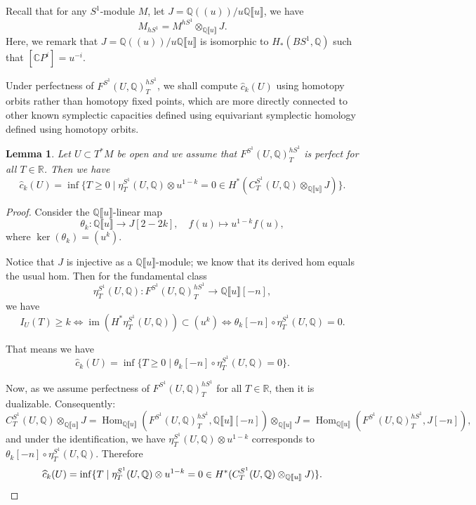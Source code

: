 \documentclass[11pt]{amsart}
\numberwithin{equation}{section}
\theoremstyle{plain}
\newtheorem{Lemma}[lemma]{Lemma}
\theoremstyle{definition}
\theoremstyle{remark}
\newcommand{\bC} { {\mathbb{C}}}
\newcommand{\bQ} { {\mathbb{Q}}}
\newcommand{\bR} { {\mathbb{R}}}
\newcommand{\fpw}[1]{{\llbracket #1\rrbracket}}
\newcommand{\fls}[1]{{(\!(#1 )\!) }}
\newcommand\im{ {\operatorname{im}} }
\newcommand\Hom{\operatorname{Hom}}
\begin{document}
Recall that for any $S^1$-module $M$, let $J=\bQ\fls{u}/u\bQ\fpw{u}$, we have
\[M_{hS^1}= M^{hS^1} \otimes_{\bQ\fpw{u}} J.\]
Here, we remark that $J=\bQ\fls{u}/u\bQ\fpw{u}$ is isomorphic to $H_{*}(BS^1,\bQ)$ such that $[\bC P^i]=u^{-i}$.




Under perfectness of $F^{S^1}(U,\bQ)^{hS^1}_T$, we shall compute $\widehat{c}_k(U)$ using homotopy orbits rather than homotopy fixed points, which are more directly connected to other known symplectic capacities defined using equivariant symplectic homology defined using homotopy orbits.


\begin{Lemma}\label{lemma: hat c definition non-deg case}Let $U\subset T^*M$ be open and we assume that $F^{S^1}(U,\bQ)^{hS^1}_T$ is perfect for all $T\in \bR$.
Then we have 
\[\widehat{c}_k(U)=\inf\{T\geq 0\mid \eta_T^{S^1}(U,\bQ)\otimes u^{1-k}=0\in H^*(C_T^{S^1} (U,\bQ)\otimes_{\bQ\fpw{u}} J)\}.\]
\end{Lemma}
\begin{proof}Consider the $\bQ\fpw{u}$-linear map 
\[\theta_k:\bQ\fpw{u}\to J[2-2k],\quad f(u)\mapsto u^{1-k}f(u),\]
where $\ker(\theta_k)=(u^k)$.

Notice that $J$ is injective as a $\bQ\fpw{u}$-module; we know that its derived hom equals the usual hom. Then for the fundamental class 
\[\eta_T^{S^1}(U,\bQ): F^{S^1}(U,\bQ)^{hS^1}_T\to  \bQ\fpw{u}[-n],\]
we have 
\[I_U(T)\geq k\iff \im (H^*\eta_T^{S^1}(U,\bQ)) \subset(u^k)\iff \theta_k[-n]\circ \eta_T^{S^1}(U,\bQ)=0.\]

That means we have
\[\widehat{c}_k(U)=\inf \{T\geq 0\mid\theta_k[-n]\circ \eta_T^{S^1}(U,\bQ)=0\} .\]

Now, as we assume perfectness of $F^{S^1}(U,\bQ)^{hS^1}_T$ for all $T\in \bR$, then it is dualizable. Consequently:
\[C_T^{S^1}(U,\bQ)\otimes_{\bQ\fpw{u}} J=\Hom_{\bQ\fpw{u}}(F^{S^1}(U,\bQ)^{hS^1}_T,\bQ\fpw{u}[-n])\otimes_{\bQ\fpw{u}} J=\Hom_{\bQ\fpw{u}}(F^{S^1}(U,\bQ)^{hS^1}_T,J[-n]),\]
and under the identification, we have
$\eta^{S^1}_T(U,\bQ)\otimes u^{1-k}$ corresponds to $\theta_k[-n]\circ \eta^{S^1}_T(U,\bQ).$
Therefore
\[\widehat{c}_k(U)=\inf \{T\mid\eta^{S^1}_T(U,\bQ)\otimes u^{1-k} =0 \in H^*(C_T^{S^1}(U,\bQ)\otimes_{\bQ\fpw{u}} J)\}. \qedhere\]
\end{proof}
\end{document}
